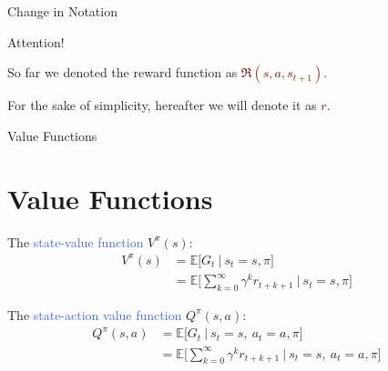 \documentclass{beamer}
\begin{document}

\begin{frame}{Change in Notation}

\begin{block}{Attention!}
\begin{normalsize}
So far we denoted the reward function as \textcolor{Maroon}{$\Re(s, a, s_{t+1})$}.
\vspace{1mm}

For the sake of simplicity, hereafter we will denote it as \textcolor{Maroon}{$r$}.
\end{normalsize}
\end{block}
\end{frame}


\begin{frame}{Value Functions}
\section{Value Functions}

The \textcolor{RoyalBlue}{state-value function} $V^{\pi}(s)$:
\begin{align*}
	V^{\pi}(s) & = \mathds{E} \bigg[G_t \: \big| \: s_t=s,\pi \bigg] \\ 
		& = \mathds{E} \bigg[\sum_{k=0}^{\infty}\gamma^{k} r_{t+k+1} \: \bigg| \: s_t=s,\pi \bigg]
\end{align*}

The \textcolor{RoyalBlue}{state-action value function} $Q^{\pi}(s,a)$:
\begin{align*}
	Q^{\pi}(s,a) & = \mathds{E} \bigg[G_t \: \big| \: s_t=s, \: a_t=a,  \pi \bigg] \\ 
		& = \mathds{E} \bigg[\sum_{k=0}^{\infty}\gamma^{k} r_{t+k+1} \: \bigg| \: s_t=s, \: a_t=a, \pi \bigg]
\end{align*}
		
\end{frame}
\end{document}
